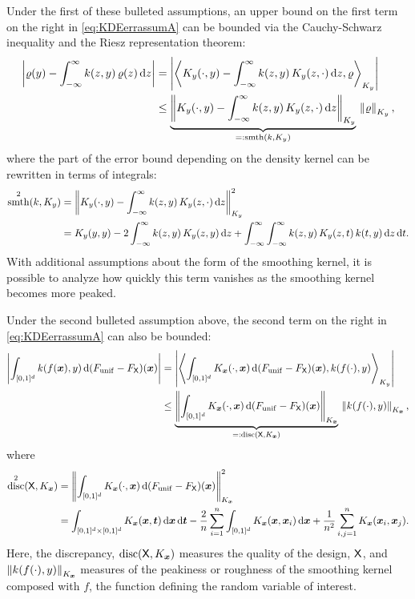 \documentclass[letterpaper]{amsart}
\newcommand{\KY}{K_y}
\newcommand{\KX}{{K_{\vx}}}
\DeclareMathOperator{\smooth}{smth}
\DeclareMathOperator{\disc}{disc}
\begin{document}
Under the first of these bulleted assumptions, an upper bound on the first term on the right in \eqref{eq:KDEerrassumA} can be bounded via the Cauchy-Schwarz inequality and the Riesz representation theorem:
\begin{align}
\label{eq:firstbd}
\abs{\varrho(y) - \int_{-\infty}^{\infty} k(z,y) \, \varrho(z) \, \dif z}
& = \abs{\ip[\KY]{\KY(\cdot,y) - \int_{-\infty}^{\infty} k(z,y) \, \KY(z,\cdot) \,  \dif z}{\varrho} } \\
\nonumber
& \le  \underbrace{\norm[\KY]{\KY(\cdot,y) - \int_{-\infty}^{\infty} k(z,y) \, \KY(z,\cdot) \, \dif z}}_{=: \smooth(k,\KY)} \, \norm[\KY]{\varrho},
\end{align}
where the part of the error bound depending on the density kernel can be rewritten in terms of integrals:
\begin{align}
\label{eq:kquality}
\smooth^2(k,\KY) &= \norm[\KY]{\KY(\cdot,y) - \int_{-\infty}^{\infty} k(z,y) \, \KY(z,\cdot) \, \dif z}^2 \\
\nonumber
&=  \KY(y,y) - 2 \int_{-\infty}^{\infty} k(z,y) \, \KY(z,y) \, \dif z  + \int_{-\infty}^{\infty} \int_{-\infty}^{\infty}  k(z,y) \, \KY(z,t) \, k(t,y)\, \dif z \, \dif t.
\end{align}
With additional assumptions about the form of the smoothing kernel, it is possible to analyze how quickly this term vanishes as the smoothing kernel becomes more peaked.

Under the second bulleted assumption above, the second term on the right in \eqref{eq:KDEerrassumA} can also be bounded:
\begin{align}
	\label{eq:secondbd}
\abs{\int_{[0,1]^d} k(f(\vx),y) \,  \dif (F_{\mathrm{unif}} - F_{\mX})(\vx)}
& = \abs{\ip[\KY]{\int_{[0,1]^d} \KX(\cdot,\vx) \,  \dif (F_{\mathrm{unif}} - F_{\mX})(\vx)}{k(f(\cdot),y) }} \\
\nonumber
& \le  \underbrace{\norm[\KX]{\int_{[0,1]^d} \KX(\cdot,\vx) \,  \dif (F_{\mathrm{unif}} - F_{\mX})(\vx)}}_{=:\disc(\mX,\KX)} \, \norm[\KX]{k(f(\cdot),y) } ,
\end{align}
where
\begin{align*}
\disc^2(\mX,\KX) & = \norm[\KX]{\int_{[0,1]^d} \KX(\cdot,\vx) \,  \dif (F_{\mathrm{unif}} - F_{\mX})(\vx)}^2 \\
\nonumber
&=  \int_{[0,1]^d \times [0,1]^d} \KX(\vx,\vt) \, \dif \vx \, \dif \vt -
\frac 2n \sum_{i=1}^n \int_{[0,1]^d} \KX(\vx,\vx_i) \, \dif \vx  + \frac 1{n^2} \sum_{i,j=1}^n  \KX(\vx_i,\vx_j) .
\end{align*}
Here, the discrepancy, $\disc(\mX,\KX)$ measures the quality of the design, $\mathsf{X}$, and $\norm[\KX]{k(f(\cdot),y) }$ measures of the peakiness or roughness of the smoothing kernel composed with $f$, the function defining the random variable of interest.
\end{document}
